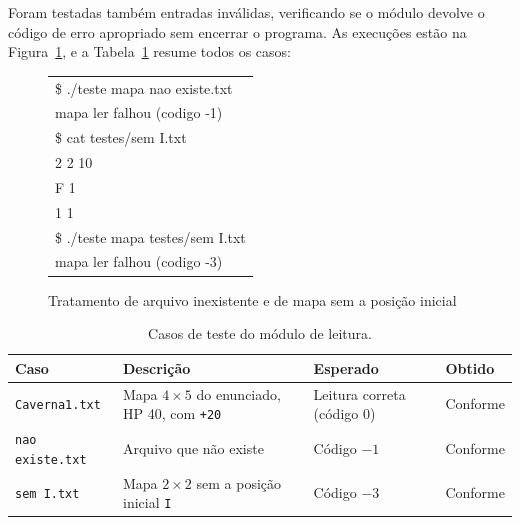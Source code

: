 \documentclass[12pt,a4paper]{article}
\makeatletter
\DeclareRobustCommand{\_}{%
  \ifmmode
    \nfss@text{\textunderscore}%
  \else
    \textunderscore\allowbreak
  \fi
}
\makeatother
\begin{document}
Foram testadas também entradas inválidas, verificando se o módulo devolve o código de erro apropriado sem encerrar o programa. As execuções estão na Figura~\ref{fig:teste_erro}, e a Tabela~\ref{tab:casos} resume todos os casos:
 
\begin{figure}[htbp]
    \centering
    \begin{minipage}{0.8\textwidth}
        \ttfamily\small
        \begin{tabular}{|l|}
        \hline
        \$ ./teste\_mapa nao\_existe.txt \\
        mapa\_ler falhou (codigo -1) \\[0.15cm]
        \$ cat testes/sem\_I.txt \\
        2 2 10 \\
        F 1 \\
        1 1 \\
        \$ ./teste\_mapa testes/sem\_I.txt \\
        mapa\_ler falhou (codigo -3) \\
        \hline
        \end{tabular}
    \end{minipage}
    \vspace{0.2cm}
    \caption{Tratamento de arquivo inexistente e de mapa sem a posição inicial}
    \label{fig:teste_erro}
\end{figure}
 
\begin{table}[htbp]
\centering
\small
\caption{Casos de teste do módulo de leitura.}
\label{tab:casos}
\vspace{0.2cm}
\begin{tabularx}{\textwidth}{|>{\raggedright\arraybackslash}p{3.3cm}|>{\raggedright\arraybackslash}X|>{\centering\arraybackslash}p{2.4cm}|>{\centering\arraybackslash}p{2.0cm}|}
\hline
\textbf{Caso} & \textbf{Descrição} & \textbf{Esperado} & \textbf{Obtido} \\
\hline
\texttt{Caverna1.txt} & Mapa $4 \times 5$ do enunciado, HP 40, com \texttt{+20} & Leitura correta (código 0) & Conforme \\
\hline
\texttt{nao\_existe.txt} & Arquivo que não existe & Código $-1$ & Conforme \\
\hline
\texttt{sem\_I.txt} & Mapa $2 \times 2$ sem a posição inicial \texttt{I} & Código $-3$ & Conforme \\
\hline
\end{tabularx}
\end{table}
 
\end{document}
